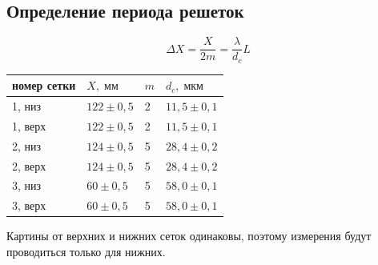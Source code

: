 
\begin{figure}[ht!]
\end{figure}

\subsection{Определение периода решеток}
\[
    \Delta X = \frac{X}{2m} = \frac{ \lambda}{d_{c}}L
\]

\begin{tabular}{|l|l|l|l|}
\hline
номер сетки & $X, \;\text{мм}$ & $m$ & $d_{c}, \;\text{мкм}$ \\\hline
    1, низ & $122 \pm 0{,}5$ & 2 & $11{,}5 \pm 0{,}1$ \\\hline
    1, верх & $122 \pm 0{,}5$ & 2 & $11{,}5 \pm 0{,}1$ \\\hline
    2, низ & $124 \pm 0{,}5$ & 5 & $28{,}4 \pm 0{,}2$ \\\hline
    2, верх & $124 \pm 0{,}5$ & 5 & $28{,}4 \pm 0{,}2$ \\\hline
    3, низ & $60 \pm 0{,}5$ & 5 & $58{,}0 \pm 0{,}1$ \\\hline
    3, верх & $60 \pm 0{,}5$ & 5 & $58{,}0 \pm 0{,}1$ \\\hline
\end{tabular}

Картины от верхних и нижних сеток одинаковы, поэтому измерения будут проводиться только для нижних.

\begin{figure}[ht!]
\end{figure}

